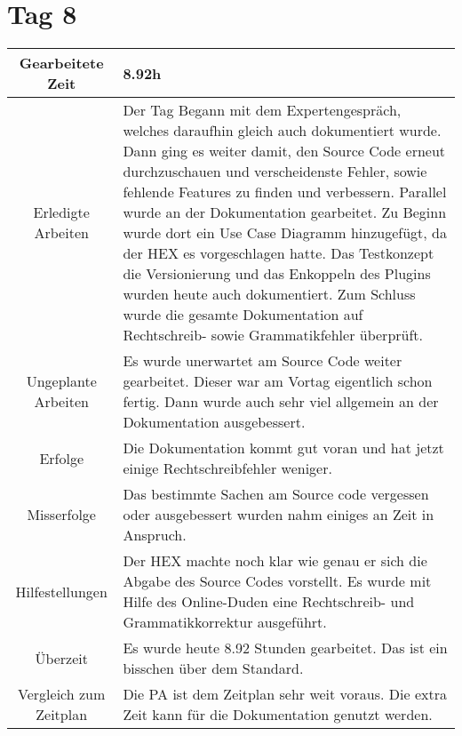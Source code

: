 \section{Tag 8}
\begin{tabularx}{\textwidth}[H]{|c|X|}
  \hline
  Gearbeitete Zeit & 8.92h \\ \hline
  Erledigte Arbeiten & Der Tag Begann mit dem Expertengespräch, welches daraufhin gleich auch dokumentiert wurde. Dann ging
  es weiter damit, den Source Code erneut durchzuschauen und verscheidenste Fehler, sowie fehlende Features zu finden und
  verbessern. \newline
  Parallel wurde an der Dokumentation gearbeitet. Zu Beginn wurde dort ein Use Case Diagramm hinzugefügt, da der HEX es
  vorgeschlagen hatte. Das Testkonzept die Versionierung und das Enkoppeln des Plugins wurden heute auch dokumentiert. 
  Zum Schluss wurde die gesamte Dokumentation auf Rechtschreib- sowie Grammatikfehler überprüft. \\ \hline
  Ungeplante Arbeiten & Es wurde unerwartet am Source Code weiter gearbeitet. Dieser war am Vortag eigentlich schon
  fertig. Dann wurde auch sehr viel allgemein an der Dokumentation ausgebessert. \\ \hline
  Erfolge & Die Dokumentation kommt gut voran und hat jetzt einige Rechtschreibfehler weniger. \\ \hline
  Misserfolge & Das bestimmte Sachen am Source code vergessen oder ausgebessert wurden nahm einiges an Zeit in Anspruch.
  \\ \hline
  Hilfestellungen & Der HEX machte noch klar wie genau er sich die Abgabe des Source Codes vorstellt.
  Es wurde mit Hilfe des Online-Duden eine Rechtschreib- und Grammatikkorrektur ausgeführt. \\ \hline
  Überzeit & Es wurde heute 8.92 Stunden gearbeitet. Das ist ein bisschen über dem Standard. \\ \hline
  Vergleich zum Zeitplan & Die PA ist dem Zeitplan sehr weit voraus. Die extra Zeit kann für die Dokumentation genutzt
  werden. \\ \hline
\end{tabularx}

\newpage

